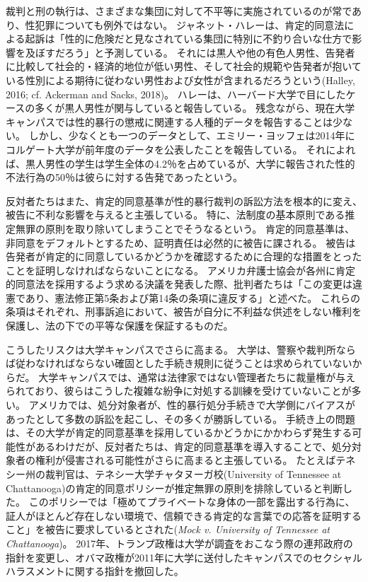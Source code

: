 \documentclass[paper=a4,book,openany]{jlreq} \usepackage{mystyle}
\begin{document}
裁判と刑の執行は、さまざまな集団に対して不平等に実施されているのが常であり、性犯罪についても例外ではない。
ジャネット・ハレーは、肯定的同意法による起訴は「性的に危険だと見なされている集団に特別に不釣り合いな仕方で影響を及ぼすだろう」と予測している。
それには黒人や他の有色人男性、告発者に比較して社会的・経済的地位が低い男性、そして社会的規範や告発者が抱いている性別による期待に従わない男性および女性が含まれるだろうという(Halley, 2016; cf. Ackerman and Sacks, 2018)\nocite{ackerman18:_dispr_minor_presen_u}。
ハレーは、ハーバード大学で目にしたケースの多くが黒人男性が関与していると報告している\citep[cf.][]{halley15:_tradin_megap_gavel_title_ix_enfor}。
残念ながら、現在大学キャンパスでは性的暴行の懲戒に関連する人種的データを報告することは少ない。
しかし、少なくとも一つのデータとして、エミリー・ヨッフェは2014年にコルゲート大学が前年度のデータを公表したことを報告している。
それによれば、黒人男性の学生は学生全体の4.2％を占めているが、大学に報告された性的不法行為の50％は彼らに対する告発であったという\citep{yoffe17:_quest_race_campus_sexual_assaul_cases}。

反対者たちはまた、肯定的同意基準が性的暴行裁判の訴訟方法を根本的に変え、被告に不利な影響を与えると主張している。
特に、法制度の基本原則である推定無罪の原則を取り除いてしまうことでそうなるという。
肯定的同意基準は、非同意をデフォルトとするため、証明責任は必然的に被告に課される。
被告は告発者が肯定的に同意しているかどうかを確認するために合理的な措置をとったことを証明しなければならないことになる。
アメリカ弁護士協会が各州に肯定的同意法を採用するよう求める決議を発表した際、批判者たちは「この変更は違憲であり、憲法修正第5条および第14条の条項に違反する」と述べた。
これらの条項はそれぞれ、刑事訴追において、被告が自分に不利益な供述をしない権利を保護し、法の下での平等な保護を保証するものだ\citep{bauer-wolf19:_lawyer_group_disag_colleg_model_affir_consen}。

こうしたリスクは大学キャンパスでさらに高まる。
大学は、警察や裁判所ならば従わなければならない確固とした手続き規則に従うことは求められていないからだ。
大学キャンパスでは、通常は法律家ではない管理者たちに裁量権が与えられており、彼らはこうした複雑な紛争に対処する訓練を受けていないことが多い。
アメリカでは、処分対象者が、性的暴行処分手続きで大学側にバイアスがあったとして多数の訴訟を起こし、その多くが勝訴している\citep{anderson19:_more_title_ix_lawsuit_accus_accus}。
手続き上の問題は、その大学が肯定的同意基準を採用しているかどうかにかかわらず発生する可能性があるわけだが、反対者たちは、肯定的同意基準を導入することで、処分対象者の権利が侵害される可能性がさらに高まると主張している。
たとえばテネシー州の裁判官は、テネシー大学チャタヌーガ校(University of Tennessee at Chattanooga)の肯定的同意ポリシーが推定無罪の原則を排除していると判断した。
このポリシーでは「極めてプライベートな身体の一部を露出する行為に、証人がほとんど存在しない環境で、信頼できる肯定的な言葉での応答を証明すること」を被告に要求しているとされた(\emph{Mock v. University of Tennessee at Chattanooga})。
2017年、トランプ政権は大学が調査をおこなう際の連邦政府の指針を変更し、オバマ政権が2011年に大学に送付したキャンパスでのセクシャルハラスメントに関する指針を撤回した。
\end{document}
